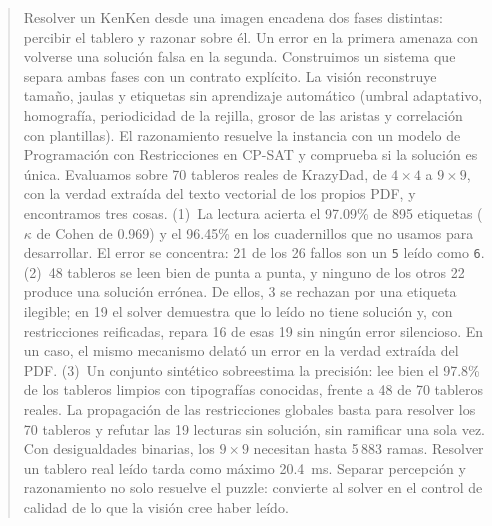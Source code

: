 \documentclass[conference]{IEEEtran}
\begin{document}
\begin{abstract}
Resolver un KenKen desde una imagen encadena dos fases distintas: percibir el tablero y razonar sobre él. Un error en la primera amenaza con volverse una solución falsa en la segunda. Construimos un sistema que separa ambas fases con un contrato explícito. La visión reconstruye tamaño, jaulas y etiquetas sin aprendizaje automático (umbral adaptativo, homografía, periodicidad de la rejilla, grosor de las aristas y correlación con plantillas). El razonamiento resuelve la instancia con un modelo de Programación con Restricciones en CP-SAT y comprueba si la solución es única. Evaluamos sobre 70 tableros reales de KrazyDad, de $4 \times 4$ a $9 \times 9$, con la verdad extraída del texto vectorial de los propios PDF, y encontramos tres cosas. (1)~La lectura acierta el 97.09\% de 895 etiquetas ($\kappa$ de Cohen de 0.969) y el 96.45\% en los cuadernillos que no usamos para desarrollar. El error se concentra: 21 de los 26 fallos son un \texttt{5} leído como \texttt{6}. (2)~48 tableros se leen bien de punta a punta, y ninguno de los otros 22 produce una solución errónea. De ellos, 3 se rechazan por una etiqueta ilegible; en 19 el solver demuestra que lo leído no tiene solución y, con restricciones reificadas, repara 16 de esas 19 sin ningún error silencioso. En un caso, el mismo mecanismo delató un error en la verdad extraída del PDF. (3)~Un conjunto sintético sobreestima la precisión: lee bien el 97.8\% de los tableros limpios con tipografías conocidas, frente a 48 de 70 tableros reales. La propagación de las restricciones globales basta para resolver los 70 tableros y refutar las 19 lecturas sin solución, sin ramificar una sola vez. Con desigualdades binarias, los $9 \times 9$ necesitan hasta 5\,883 ramas. Resolver un tablero real leído tarda como máximo 20.4~ms. Separar percepción y razonamiento no solo resuelve el puzzle: convierte al solver en el control de calidad de lo que la visión cree haber leído.
\end{abstract}
\end{document}
